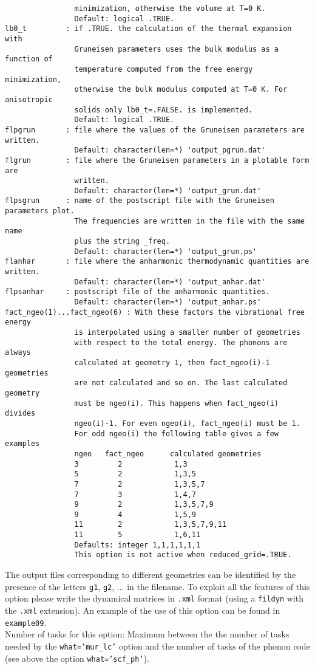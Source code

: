 \documentclass[12pt,a4paper]{article}
\begin{document}
\begin{verbatim}
                minimization, otherwise the volume at T=0 K.
                Default: logical .TRUE.
lb0_t         : if .TRUE. the calculation of the thermal expansion with 
                Gruneisen parameters uses the bulk modulus as a function of 
                temperature computed from the free energy minimization, 
                otherwise the bulk modulus computed at T=0 K. For anisotropic
                solids only lb0_t=.FALSE. is implemented.
                Default: logical .TRUE.
flpgrun       : file where the values of the Gruneisen parameters are written. 
                Default: character(len=*) 'output_pgrun.dat'
flgrun        : file where the Gruneisen parameters in a plotable form are
                written.
                Default: character(len=*) 'output_grun.dat'
flpsgrun      : name of the postscript file with the Gruneisen parameters plot.
                The frequencies are written in the file with the same name 
                plus the string _freq.
                Default: character(len=*) 'output_grun.ps'
flanhar       : file where the anharmonic thermodynamic quantities are written.
                Default: character(len=*) 'output_anhar.dat'
flpsanhar     : postscript file of the anharmonic quantities.
                Default: character(len=*) 'output_anhar.ps'
fact_ngeo(1)...fact_ngeo(6) : With these factors the vibrational free energy 
                is interpolated using a smaller number of geometries 
                with respect to the total energy. The phonons are always 
                calculated at geometry 1, then fact_ngeo(i)-1 geometries 
                are not calculated and so on. The last calculated geometry 
                must be ngeo(i). This happens when fact_ngeo(i) divides
                ngeo(i)-1. For even ngeo(i), fact_ngeo(i) must be 1.
                For odd ngeo(i) the following table gives a few examples
                ngeo   fact_ngeo      calculated geometries
                3         2            1,3
                5         2            1,3,5
                7         2            1,3,5,7
                7         3            1,4,7
                9         2            1,3,5,7,9
                9         4            1,5,9
                11        2            1,3,5,7,9,11
                11        5            1,6,11
                Defaults: integer 1,1,1,1,1,1
                This option is not active when reduced_grid=.TRUE.
\end{verbatim}
The output files corresponding to different geometries can be identified
by the presence of the letters \texttt{g1}, \texttt{g2}, ... in the filename.
To exploit all the features of this option please write the dynamical matrices
in \texttt{.xml} format (using a \texttt{fildyn} with the \texttt{.xml}
extension).
An example of the use of this option can be found in \texttt{example09}. \\
Number of tasks for this option: Maximum between the the number of tasks  
needed by the \texttt{what='mur\_lc'} option and the number
of tasks of the phonon code (see above the option \texttt{what='scf\_ph'}). \\
\end{document}
